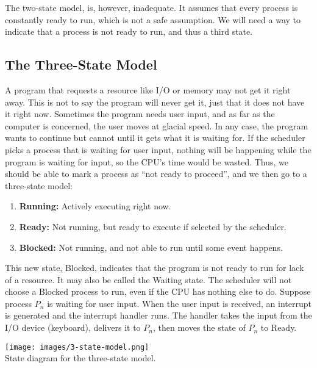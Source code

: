 The two-state model, is, however, inadequate. It assumes that every process is constantly ready to run, which is not a safe assumption. We will need a way to indicate that a process is not ready to run, and thus a third state.

\subsection*{The Three-State Model}

A program that requests a resource like I/O or memory may not get it right away. This is not to say the program will never get it, just that it does not have it right now. Sometimes the program needs user input, and as far as the computer is concerned, the user moves at glacial speed. In any case, the program wants to continue but cannot until it gets what it is waiting for.  If the scheduler picks a process that is waiting for user input, nothing will be happening while the program is waiting for input, so the CPU's time would be wasted. Thus, we should be able to mark a process as ``not ready to proceed'', and we then go to a three-state model:

\begin{enumerate}
 \item \textbf{Running:} Actively executing right now.
 \item \textbf{Ready:} Not running, but ready to execute if selected by the scheduler.
 \item \textbf{Blocked:} Not running, and not able to run until some event happens.
\end{enumerate}

This new state, Blocked, indicates that the program is not ready to run for lack of a resource. It may also be called the Waiting state. The scheduler will not choose a Blocked process to run, even if the CPU has nothing else to do. Suppose process $P_{n}$ is waiting for user input. When the user input is received, an interrupt is generated and the interrupt handler runs. The handler takes the input from the I/O device (keyboard), delivers it to $P_{n}$, then moves the state of $P_{n}$ to Ready.

\begin{center}
\texttt{[image: images/3-state-model.png]}\\
State diagram for the three-state model.
\end{center}

